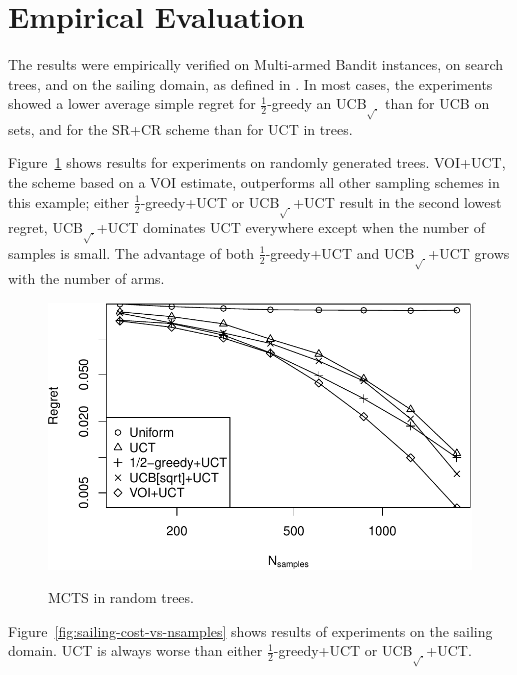 \documentclass[letterpaper]{article}
\begin{document}
\section{Empirical Evaluation}
\label{sec:emp}

The results were empirically verified on Multi-armed Bandit instances,
on search trees, and on the sailing domain, as defined in
\cite{Kocsis.uct}. In most cases, the experiments showed a lower average
simple regret for $\frac 1 2$-greedy an UCB$_{\sqrt{\cdot}}$ than for
UCB on sets, and for the SR+CR scheme than for UCT in trees.

Figure~\ref{fig:mcts-regret} shows
results for experiments on randomly generated trees. VOI+UCT, the scheme based on a VOI estimate,
outperforms all other sampling schemes in this example; either $\frac 1
2$-greedy+UCT or UCB$_{\sqrt{\cdot}}$+UCT
result in the second lowest regret, UCB$_{\sqrt{\cdot}}$+UCT dominates UCT everywhere
except when the number of samples is small. The advantage of both $\frac 1
2$-greedy+UCT and UCB$_{\sqrt{\cdot}}$+UCT grows with the number of arms.
\begin{figure}[h!]
  \centering
  \includegraphics[scale=0.5]{tree-identity-k=32-uqb=8+voi.pdf}\\
  \caption{MCTS in random trees.}
  \label{fig:mcts-regret} 
\end{figure}

Figure~\ref{fig:sailing-cost-vs-nsamples}
shows results of experiments on the sailing
domain. UCT is always worse than either $\frac 1 2$-greedy+UCT or
UCB$_{\sqrt{\cdot}}$+UCT.
\end{document}
